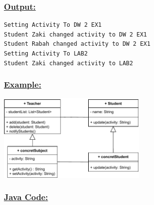 

\vspace{0.25cm}


\vspace{0.25cm}

\newpage


\vspace{0.5cm}

\newpage

\subsubsection*{\underline{Output:}}
\begin{lstlisting}[style=cmd]
Setting Activity To DW 2 EX1
Student Zaki changed activity to DW 2 EX1
Student Rabah changed activity to DW 2 EX1
Setting Activity To LAB2
Student Zaki changed activity to LAB2
\end{lstlisting}
\vspace{0.5cm}

\vspace{0.25cm}
\subsubsection*{\underline{Example:}}

\vspace{0.25cm}
\begin{center}
\includegraphics[width=0.55\textwidth,height=0.4\textheight]{Chapters/DesignPattern/Observer/obs2.drawio.pdf}
\end{center}

\newpage
\subsubsection*{\underline{Java Code:}}


